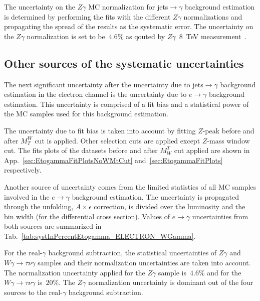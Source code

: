 The uncertainty on the $Z\gamma$ MC normalization for jets$\rightarrow\gamma$ background estimation is determined by performing the fits with the different $Z\gamma$ normalizations and propagating the spread of the results as the systematic error. The uncertainty on the $Z\gamma$ normalization is set to be~$4.6\%$ as qouted by $Z\gamma$~$8$~TeV measurement~\cite{ref_Zg8TeV}.

\subsection{Other sources of the systematic uncertainties}
\label{sec:Systematics_OtherSources}

The next significant uncertainty after the uncertainty due to jets$\rightarrow\gamma$ background estimation in the electron channel is the uncertainty due to $e\rightarrow\gamma$ background estimation. This uncertainty is comprised of a fit bias and a statistical power of the MC samples used for this background estimation. 

The uncertainty due to fit bias is taken into account by fitting $Z$-peak before and after $M_T^W$ cut is applied. Other selection cuts are applied except $Z$-mass window cut. The fits plots of the datasets before and after $M_W^T$ cut applied are shown in App.~\ref{sec:EtogammaFitPlotsNoWMtCut} and~\ref{sec:EtogammaFitPlots} respectively.

Another source of uncertainty comes from the limited statistics of all MC samples involved in the $e\rightarrow\gamma$ background estimation. The uncertainty is propagated through the unfolding, $A \times \epsilon$ correction, is divided over the luminosity and the bin width (for the differential cross section). Values of $e\rightarrow\gamma$ uncertainties from both sources are summarized in Tab.~\ref{tab:systInPercentEtogamma_ELECTRON_WGamma}.


For the real-$\gamma$ background subtraction, the statistical uncertainties of $Z\gamma$ and $W\gamma\rightarrow\tau\nu\gamma$ samples and their normalization uncertainties are taken into account. The normalization uncertainty applied for the $Z\gamma$ sample is~$4.6\%$ and for the $W\gamma\rightarrow\tau\nu\gamma$ is~$20\%$. The $Z\gamma$ normalization uncertainty is dominant out of the four sources to the real-$\gamma$ background subtraction.


